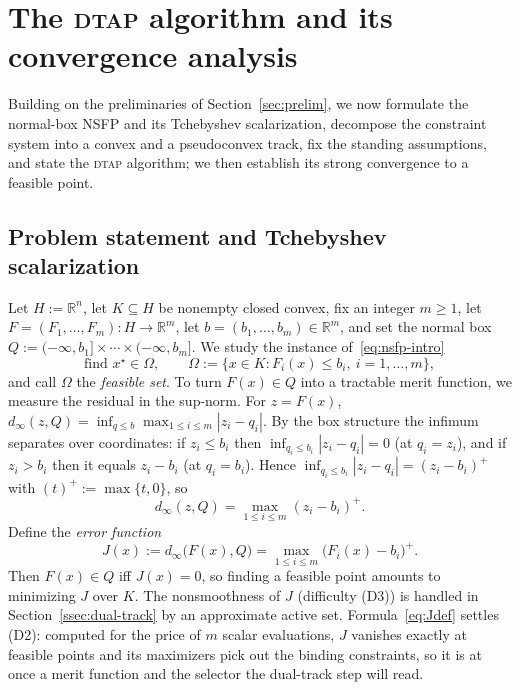 \documentclass[]{interact}
\theoremstyle{plain}
\theoremstyle{definition}
\theoremstyle{remark}
\newcommand{\R}{\mathbb{R}}
\newcommand{\abs}[1]{\left\lvert #1 \right\rvert}
\newcommand{\dtap}{\textsc{dtap}}
\begin{document}
\section{The \textsc{dtap} algorithm and its convergence analysis}\label{sec:convergence}
Building on the preliminaries of Section~\ref{sec:prelim}, we now formulate the normal-box
NSFP and its Tchebyshev scalarization, decompose the constraint system into a convex and a
pseudoconvex track, fix the standing assumptions, and state the \dtap{} algorithm; we then
establish its strong convergence to a feasible point.

\subsection{Problem statement and Tchebyshev scalarization}\label{ssec:model-stmt}
Let $H:=\R^n$, let $K\subseteq H$ be nonempty closed convex, fix an integer $m\ge 1$,
let $F=(F_1,\dots,F_m):H\to\R^m$, let $b=(b_1,\dots,b_m)\in\R^m$, and set the normal box
$Q:=(-\infty,b_1]\times\cdots\times(-\infty,b_m]$. We study the instance
of~\eqref{eq:nsfp-intro}
\begin{equation}\label{eq:nsfp-box}
\text{find } x^\star\in\Omega,\qquad
\Omega:=\bigl\{x\in K: F_i(x)\le b_i,\ i=1,\dots,m\bigr\},
\end{equation}
and call $\Omega$ the \emph{feasible set}. To turn $F(x)\in Q$ into a tractable merit
function, we measure the residual in the sup-norm. For $z=F(x)$,
$d_\infty(z,Q)=\inf_{q\le b}\max_{1\le i\le m}\abs{z_i-q_i}$. By the box structure the
infimum separates over coordinates: if $z_i\le b_i$ then
$\inf_{q_i\le b_i}\abs{z_i-q_i}=0$ (at $q_i=z_i$), and if $z_i>b_i$ then it equals
$z_i-b_i$ (at $q_i=b_i$). Hence $\inf_{q_i\le b_i}\abs{z_i-q_i}=(z_i-b_i)^+$ with
$(t)^+:=\max\{t,0\}$, so
\begin{equation}\label{eq:dinfty}
d_\infty(z,Q)=\max_{1\le i\le m}(z_i-b_i)^+ .
\end{equation}
Define the \emph{error function}
\begin{equation}\label{eq:Jdef}
J(x):=d_\infty\bigl(F(x),Q\bigr)=\max_{1\le i\le m}\bigl(F_i(x)-b_i\bigr)^+ .
\end{equation}
Then $F(x)\in Q$ iff $J(x)=0$, so finding a feasible point amounts to minimizing $J$
over $K$. The nonsmoothness of $J$ (difficulty (D3)) is handled in
Section~\ref{ssec:dual-track} by an approximate active set. Formula~\eqref{eq:Jdef}
settles (D2): computed for the price of $m$ scalar evaluations, $J$ vanishes exactly at feasible
points and its maximizers pick out the binding constraints, so it is at once a merit function and
the selector the dual-track step will read.
\end{document}

